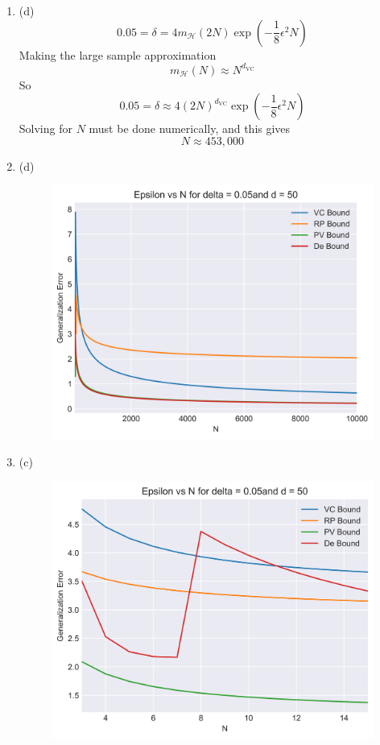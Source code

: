 \documentclass[12pt]{article}
\newcommand{\dvc}{{d_{\text{VC}}}}
\begin{document}
\begin{enumerate}[leftmargin=*]
\item (d)
\[ 0.05 = \delta = 4 m_{\mathcal H}(2N) \exp \left(- \frac{1}{8} \epsilon^2 N \right) \]
Making the large sample approximation
\[ m_{\mathcal H} (N) \approx N^\dvc \]
So
\[ 0.05 = \delta \approx 4 (2 N)^\dvc \exp \left( - \frac{1}{8} \epsilon^2 N \right)\]
Solving for $N$ must be done numerically, and this gives
\[ N \approx 453,000 \]
\item (d)
\begin{figure}[h!]
\centering
\includegraphics[scale=0.55]{epsilonvsN.png}
\end{figure}
\item (c)
\begin{figure}[h!]
\centering
\includegraphics[scale=0.55]{epsilonvssmallN.png}

\end{figure}
\end{enumerate}
\end{document}

